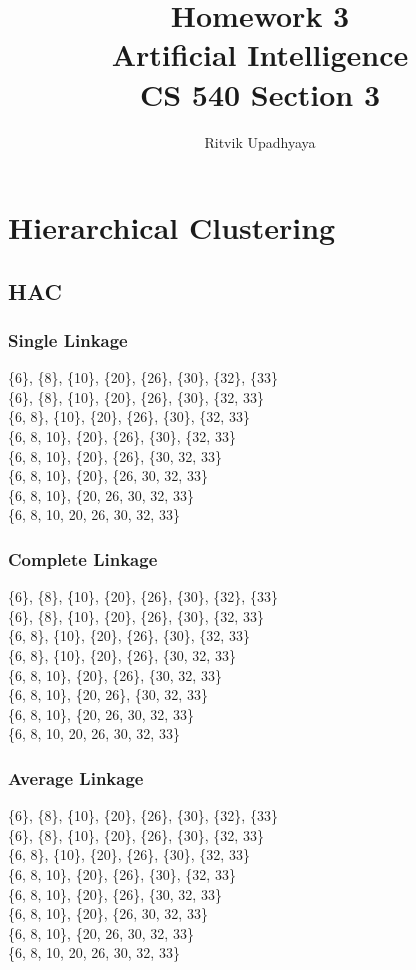 \documentclass{article}
\title{\Huge Homework 3
		\\\LARGE Artificial Intelligence
		\\\LARGE CS 540 Section 3
		\vspace{2pc}}
\author{Ritvik Upadhyaya}
\date{}
\begin{document}
	\maketitle
	\newpage
	\tableofcontents
	\newpage

	\section{Hierarchical Clustering}
		\subsection{HAC}
		\subsubsection{Single Linkage}
		\{6\}, \{8\}, \{10\}, \{20\}, \{26\}, \{30\}, \{32\}, \{33\}\\
		\{6\}, \{8\}, \{10\}, \{20\}, \{26\}, \{30\}, \{32, 33\}\\
		\{6, 8\}, \{10\}, \{20\}, \{26\}, \{30\}, \{32, 33\}\\
		\{6, 8, 10\}, \{20\}, \{26\}, \{30\}, \{32, 33\}\\
		\{6, 8, 10\}, \{20\}, \{26\}, \{30, 32, 33\}\\
		\{6, 8, 10\}, \{20\}, \{26, 30, 32, 33\}\\
		\{6, 8, 10\}, \{20, 26, 30, 32, 33\}\\
		\{6, 8, 10, 20, 26, 30, 32, 33\}

		\subsubsection{Complete Linkage}
		\{6\}, \{8\}, \{10\}, \{20\}, \{26\}, \{30\}, \{32\}, \{33\}\\
		\{6\}, \{8\}, \{10\}, \{20\}, \{26\}, \{30\}, \{32, 33\}\\
		\{6, 8\}, \{10\}, \{20\}, \{26\}, \{30\}, \{32, 33\}\\
		\{6, 8\}, \{10\}, \{20\}, \{26\}, \{30, 32, 33\}\\
		\{6, 8, 10\}, \{20\}, \{26\}, \{30, 32, 33\}\\
		\{6, 8, 10\}, \{20, 26\}, \{30, 32, 33\}\\
		\{6, 8, 10\}, \{20, 26, 30, 32, 33\}\\
		\{6, 8, 10, 20, 26, 30, 32, 33\}

		\subsubsection{Average Linkage}
		\{6\}, \{8\}, \{10\}, \{20\}, \{26\}, \{30\}, \{32\}, \{33\}\\
		\{6\}, \{8\}, \{10\}, \{20\}, \{26\}, \{30\}, \{32, 33\}\\
		\{6, 8\}, \{10\}, \{20\}, \{26\}, \{30\}, \{32, 33\}\\
		\{6, 8, 10\}, \{20\}, \{26\}, \{30\}, \{32, 33\}\\
		\{6, 8, 10\}, \{20\}, \{26\}, \{30, 32, 33\}\\
		\{6, 8, 10\}, \{20\}, \{26, 30, 32, 33\}\\
		\{6, 8, 10\}, \{20, 26, 30, 32, 33\}\\
		\{6, 8, 10, 20, 26, 30, 32, 33\}
\end{document}
